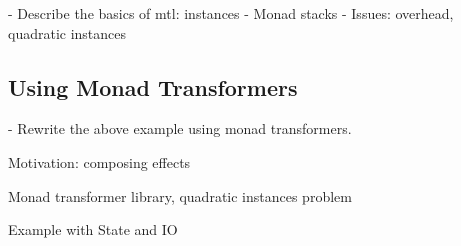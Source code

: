 - Describe the basics of mtl: instances
- Monad stacks
- Issues: overhead, quadratic instances

\subsection{Using Monad Transformers}

- Rewrite the above example using monad transformers.

\begin{notelist}
    \item Motivation: composing effects
    \item Monad transformer library, quadratic instances problem
    \item Example with State and IO
\end{notelist}

